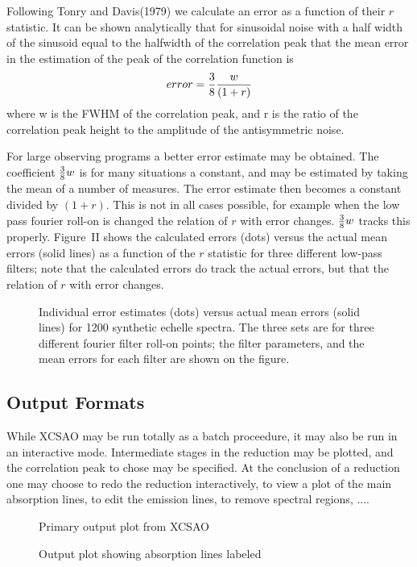 Following Tonry and Davis(1979) we calculate an error as a function of their
$r$
statistic.  It can be shown analytically that for sinusoidal noise with a half
width of the sinusoid equal to the halfwidth of the correlation peak that the
mean error in the estimation of the peak of the correlation function is 
\begin{equation}
error = {3\over 8}{w \over{(1+r)}}
\end{equation}
where w is the FWHM of the correlation peak, and r is the ratio of the
correlation peak height to the amplitude of the antisymmetric noise.

For large observing programs a better error estimate may be obtained.  The
coefficient ${3 \over 8} w$ is for many situations a constant, and may be
estimated by taking the mean of a number of measures.  The error estimate then
becomes a constant divided by $(1 + r)$.  This is not in all cases possible, for
example when the low pass fourier roll-on is changed the relation of $r$ with
error changes.  ${3 \over 8} w$ tracks this properly.  Figure~II shows the
calculated errors (dots) versus the actual mean errors (solid lines) as a
function of the $r$ statistic for three different low-pass filters; note that the
calculated errors do track the actual errors, but that the relation of $r$ with
error changes.
\begin{figure}
\vspace {8cm}
\caption{Individual error estimates (dots) versus actual mean errors (solid
lines) for 1200 synthetic echelle spectra.  The three sets are for three
different fourier filter roll-on points; the filter parameters, and the mean
errors for each filter are shown on the figure.}\label{fig-2}
\end{figure}

\subsection{Output Formats}

While XCSAO may be run totally as a batch proceedure, it may also be run in an
interactive mode.  Intermediate stages in the reduction may be plotted, and the
correlation peak to chose may be specified.  At the conclusion of a reduction
one may choose to redo the reduction interactively, to view a plot of the main
absorption lines, to edit the emission lines, to remove spectral regions, ....

\begin{figure}
\vspace{8cm}
\caption{Primary output plot from XCSAO}\label{fig-3}
\end{figure}
\begin{figure}
\vspace{8cm}                                    
\caption{Output plot showing absorption lines labeled}\label{fig-4}
\end{figure}

